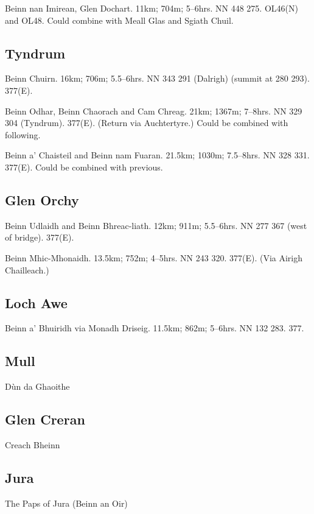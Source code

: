 \begin{munros}
\item
Beinn nan Imirean, Glen Dochart.  11km; 704m; 5--6hrs.  NN 448 275.  OL46(N) and
OL48.  Could combine with Meall Glas and Sgiath Chuil.
\end{munros}


\subsection{Tyndrum}

\begin{munros}
\item
Beinn Chuirn.  16km; 706m; 5.5--6hrs.  NN 343 291 (Dalrigh) (summit at 280
293).  377(E).

\item
Beinn Odhar, Beinn Chaorach and Cam Chreag.  21km; 1367m; 7--8hrs.  NN 329 304
(Tyndrum).  377(E).  (Return via Auchtertyre.)  Could be combined with following.

\item
Beinn a' Chaisteil and Beinn nam Fuaran.  21.5km; 1030m; 7.5--8hrs.  NN 328
331.  377(E).  Could be combined with previous. 
\end{munros}


\subsection{Glen Orchy}

\begin{munros}
\item
Beinn Udlaidh and Beinn Bhreac-liath.  12km; 911m; 5.5--6hrs.  NN 277 367
(west of bridge).  377(E).  \tick

\item
Beinn Mhic-Mhonaidh.  13.5km; 752m; 4--5hrs.  NN 243 320.  377(E).  (Via
Airigh Chailleach.)
\end{munros}


\subsection{Loch Awe}

\begin{munros}
\item\target
Beinn a' Bhuiridh via Monadh Driseig.  11.5km; 862m; 5--6hrs.  NN 132 283.
377.
\end{munros}


\subsection{Mull}

Dùn da Ghaoithe


\subsection{Glen Creran}

Creach Bheinn

\subsection{Jura}

The Paps of Jura (Beinn an Oir)

